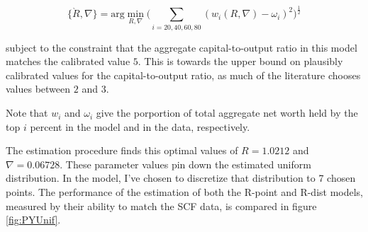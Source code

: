 $$ \{\grave{R}, \nabla\} = \text{arg}\min_{R, \nabla} \bigg( \sum_{i=20, 40, 60, 80} (w_{i}(R, \nabla)-\omega_i )^{2} \bigg)^{\frac{1}{2}} $$

\par subject to the constraint that the aggregate capital-to-output ratio in this model matches the calibrated value $5$. This is towards the upper bound on plausibly calibrated values for the capital-to-output ratio, as much of the literature chooses values between $2$ and  $3$.

\par Note that $w_i$ and $\omega_i$ give the porportion of total aggregate net worth held by the top $i$ percent in the model and in the data, respectively.

\par The estimation procedure finds this optimal values of $R = 1.0212$ and $\nabla = 0.06728$. These parameter values pin down the estimated uniform distribution. In the model, I've chosen to discretize that distribution to 7 chosen points. The performance of the estimation of both the R-point and R-dist models, measured by their ability to match the SCF data, is compared in figure \ref{fig:PYUnif}.

